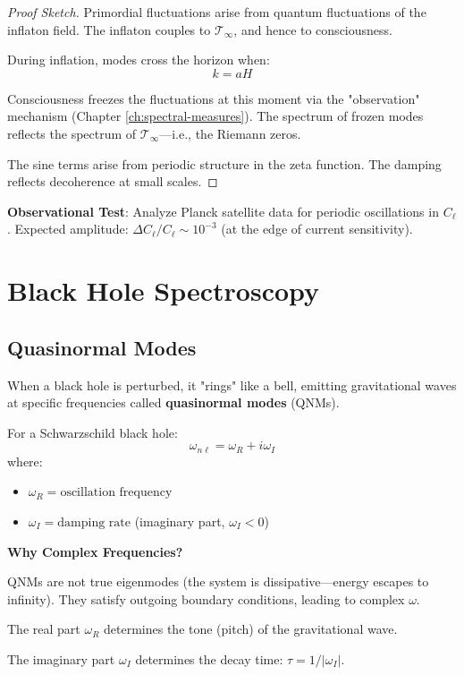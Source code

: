 \begin{proof}[Proof Sketch]
Primordial fluctuations arise from quantum fluctuations of the inflaton field. The inflaton couples to $\mathcal{T}_\infty$, and hence to consciousness.

During inflation, modes cross the horizon when:
\begin{equation}
k = aH
\end{equation}

Consciousness freezes the fluctuations at this moment via the "observation" mechanism (Chapter \ref{ch:spectral-measures}). The spectrum of frozen modes reflects the spectrum of $\mathcal{T}_\infty$---i.e., the Riemann zeros.

The sine terms arise from periodic structure in the zeta function. The damping reflects decoherence at small scales.
\end{proof}

\textbf{Observational Test}: Analyze Planck satellite data for periodic oscillations in $C_\ell$. Expected amplitude: $\Delta C_\ell / C_\ell \sim 10^{-3}$ (at the edge of current sensitivity).

\section{Black Hole Spectroscopy}

\subsection{Quasinormal Modes}

When a black hole is perturbed, it "rings" like a bell, emitting gravitational waves at specific frequencies called \textbf{quasinormal modes} (QNMs).

For a Schwarzschild black hole:
\begin{equation}
\omega_{n\ell} = \omega_R + i\omega_I
\end{equation}
where:
\begin{itemize}
\item $\omega_R = \text{oscillation frequency}$
\item $\omega_I = \text{damping rate}$ (imaginary part, $\omega_I < 0$)
\end{itemize}

\begin{level1}
\textbf{Why Complex Frequencies?}

QNMs are not true eigenmodes (the system is dissipative---energy escapes to infinity). They satisfy outgoing boundary conditions, leading to complex $\omega$.

The real part $\omega_R$ determines the tone (pitch) of the gravitational wave.

The imaginary part $\omega_I$ determines the decay time: $\tau = 1/|\omega_I|$.
\end{level1}

